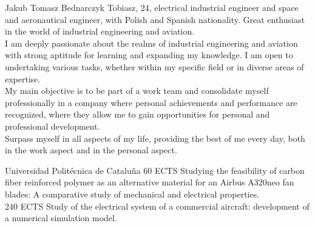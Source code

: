 \documentclass[
	a4paper,
]{fortysecondscv}
\begin{document}
\makefrontsidebar

{Jakub Tomasz Bednarczyk Tobiasz, 24, electrical industrial engineer and space and aeronautical engineer, with Polish and Spanish nationality. Great enthusiast in the world of industrial engineering and aviation.}\vspace{10pt}
\\ 
{I am deeply passionate about the realms of industrial engineering and aviation with strong aptitude for learning and expanding my knowledge. 
 I am open to undertaking various tasks, whether within my specific field or in diverse areas of expertise.}\vspace{10pt}
\\
{My main objective is to be part of a work team and consolidate myself professionally in a company where personal achievements and performance are recognized, where they allow me to gain opportunities for personal and professional development.}\vspace{10pt}
\\
{Surpass myself in all aspects of my life, providing the best of me every day, both in the work aspect and in the personal aspect.}
	


\begin{cvtable}[1.5]
	{Universidad Politécnica de Cataluña}
		{60 ECTS}
		{Studying the feasibility of carbon fiber reinforced polymer as an alternative material for an Airbus A320neo fan blades: A comparative study of mechanical and electrical properties.}
	\\
		{240 ECTS}
		{Study of the electrical system of a commercial aircraft: development of a numerical simulation model.}

\end{cvtable}
\\

\begin{cvtable}[3]
	\end{cvtable}
 
\end{document}
